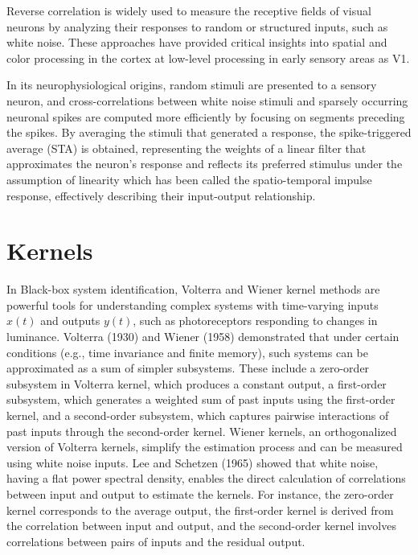 Reverse correlation is widely used to measure the receptive fields of visual neurons by analyzing their responses to random or structured inputs, such as white noise. These approaches have provided critical insights into spatial and color processing in the cortex at low-level processing in early sensory areas as V1. \cite{marmarelis_analysis_1978}

In its neurophysiological origins, random stimuli are presented to a sensory neuron, and cross-correlations between white noise stimuli and sparsely occurring neuronal spikes are computed more efficiently by focusing on segments preceding the spikes. By averaging the stimuli that generated a response, the spike-triggered average (STA) is obtained, representing the weights of a linear filter that approximates the neuron's response and reflects its preferred stimulus under the assumption of linearity which has been called the spatio-temporal impulse response, effectively describing their input-output relationship.

\section {Kernels} 
In Black-box system identification, Volterra and Wiener kernel methods \cite{eggermont_wiener_1993}are powerful tools for understanding complex systems with time-varying inputs $x(t)$ and outputs $y(t)$, such as photoreceptors responding to changes in luminance. Volterra (1930) and Wiener (1958) demonstrated that under certain conditions (e.g., time invariance and finite memory), such systems can be approximated as a sum of simpler subsystems. These include a zero-order subsystem in Volterra kernel, which produces a constant output, a first-order subsystem, which generates a weighted sum of past inputs using the first-order kernel, and a second-order subsystem, which captures pairwise interactions of past inputs through the second-order kernel.
Wiener kernels, an orthogonalized version of Volterra kernels, simplify the estimation process and can be measured using white noise inputs. Lee and Schetzen (1965) showed that white noise, having a flat power spectral density, enables the direct calculation of correlations between input and output to estimate the kernels. For instance, the zero-order kernel corresponds to the average output, the first-order kernel is derived from the correlation between input and output, and the second-order kernel involves correlations between pairs of inputs and the residual output. 


